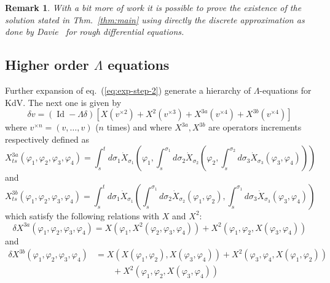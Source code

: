 \documentclass[a4paper,12pt,reqno]{article}
\newcommand{\der}{\delta}
\DeclareMathOperator{\id}{\text{Id}}
\newtheorem{remark}[theorem]{Remark}
\begin{document}
\begin{remark}
With a bit more of work it is possible to prove the existence of
the solution stated in Thm.~\ref{thm:main} using directly the discrete
approximation as done by Davie~\cite{davie} for rough
differential equations.
\end{remark}


\subsection{Higher order $\Lambda$ equations}
\label{sec:more}
Further expansion of eq.~(\ref{eq:exp-step-2}) generate a hierarchy of
$\Lambda$-equations for KdV. The next one is given by
\begin{equation}
  \label{eq:hier-next}
  \der v = (\id-\Lambda\der) [X(v^{\times 2}) + X^2 (v^{\times 3}) + X^{3a}(v^{\times 4}) + X^{3b}(v^{\times 4})]
\end{equation}
where $v^{\times n} = (v,\dots,v)$ ($n$ times) and where $X^{3a},X^{3b}$ are operators increments respectively defined as
\begin{equation}
  \label{eq:X3a}
  X^{3a}_{ts}(\varphi_1,\varphi_2,\varphi_3,\varphi_4) = \int_s^t
  d\sigma_1 \dot
  X_{\sigma_1}(\varphi_1,\int_s^{\sigma_1}d\sigma_2 \dot X_{\sigma_2}(\varphi_2,
\int_s^{\sigma_2}d\sigma_3 \dot X_{\sigma_3}(\varphi_3,\varphi_4)))
\end{equation}
and
\begin{equation}
  \label{eq:X3b}
  X^{3b}_{ts}(\varphi_1,\varphi_2,\varphi_3,\varphi_4) = \int_s^t
  d\sigma_1 \dot
  X_{\sigma_1}(\int_s^{\sigma_1}d\sigma_2 \dot
  X_{\sigma_2}(\varphi_1,\varphi_2),
\int_s^{\sigma_1}d\sigma_3 \dot
  X_{\sigma_3}(\varphi_3,\varphi_4))
\end{equation}
which satisfy the following relations with $X$ and $X^2$:
\begin{equation}
  \label{eq:deltaX3a}
  \der X^{3a}(\varphi_1,\varphi_2,\varphi_3,\varphi_4) =
  X(\varphi_1,X^2(\varphi_2,\varphi_3,\varphi_4)) + X^2(\varphi_1,\varphi_2,X(\varphi_3,\varphi_4))
\end{equation}
and
\begin{equation}
  \label{eq:deltaX3b}
  \begin{split}
  \der X^{3b}(\varphi_1,\varphi_2,\varphi_3,\varphi_4) & =
  X(X(\varphi_1,\varphi_2),X(\varphi_3,\varphi_4)) +
  X^2(\varphi_3,\varphi_4,X(\varphi_1,\varphi_2))
\\ & \qquad  + X^2(\varphi_1,\varphi_2,X(\varphi_3,\varphi_4))    
  \end{split}
\end{equation}
\end{document}
